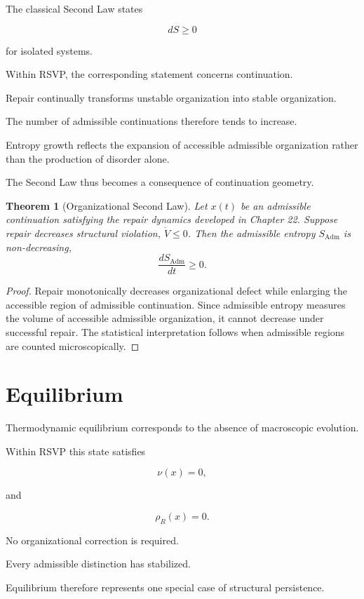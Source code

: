 \documentclass[11pt,oneside]{book}
\numberwithin{equation}{chapter}
\theoremstyle{definition}
\theoremstyle{plain}
\newtheorem{theorem}[definition]{Theorem}
\begin{document}
The classical Second Law states

\[
dS
\ge
0
\]

for isolated systems.

Within RSVP, the corresponding statement concerns continuation.

Repair continually transforms unstable organization into stable
organization.

The number of admissible continuations therefore tends to increase.

Entropy growth reflects the expansion of accessible admissible organization
rather than the production of disorder alone.

The Second Law thus becomes a consequence of continuation geometry.

\begin{theorem}[Organizational Second Law]
Let \(x(t)\) be an admissible continuation satisfying the repair dynamics
developed in Chapter 22. Suppose repair decreases structural violation,
\(\dot V\le 0\). Then the admissible entropy \(S_{\mathrm{Adm}}\) is
non-decreasing,
\[
\boxed{
\frac{dS_{\mathrm{Adm}}}{dt}
\ge
0.
}
\]
\end{theorem}

\begin{proof}
Repair monotonically decreases organizational defect while enlarging the
accessible region of admissible continuation. Since admissible entropy
measures the volume of accessible admissible organization, it cannot
decrease under successful repair. The statistical interpretation follows
when admissible regions are counted microscopically.
\end{proof}

\section{Equilibrium}

Thermodynamic equilibrium corresponds to the absence of macroscopic
evolution.

Within RSVP this state satisfies

\[
\nu(x)=0,
\]

and

\[
\rho_R(x)=0.
\]

No organizational correction is required.

Every admissible distinction has stabilized.

Equilibrium therefore represents one special case of structural persistence.
\end{document}
